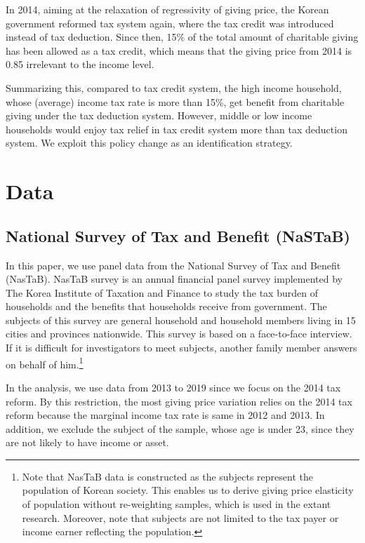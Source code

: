 \documentclass[
  11pt,
  a4paper,
]{article}
\begin{document}
  In 2014, aiming at the relaxation of regressivity of giving price, the Korean government reformed tax system again, where the tax credit was introduced instead of tax deduction. Since then, 15\% of the total amount of charitable giving has been allowed as a tax credit, which means that the giving price from 2014 is 0.85 irrelevant to the income level.

  Summarizing this, compared to tax credit system, the high income household, whose (average) income tax rate is more than 15\%, get benefit from charitable giving under the tax deduction system. However, middle or low income households would enjoy tax relief in tax credit system more than tax deduction system. We exploit this policy change as an identification strategy.

  \hypertarget{data}{%
  \section{Data}\label{data}}

  \hypertarget{national-survey-of-tax-and-benefit-nastab}{%
  \subsection{National Survey of Tax and Benefit (NaSTaB)}\label{national-survey-of-tax-and-benefit-nastab}}

  In this paper, we use panel data from the National Survey of Tax and Benefit (NasTaB).
  NasTaB survey is an annual financial panel survey
  implemented by The Korea Institute of Taxation and Finance
  to study the tax burden of households and the benefits that households receive from government.
  The subjects of this survey are general household and household members living in 15 cities
  and provinces nationwide.
  This survey is based on a face-to-face interview.
  If it is difficult for investigators to meet subjects, another family member answers on behalf of him.\footnote{Note that NasTaB data is constructed as the subjects represent the population of Korean society. This enables us to derive giving price elasticity of population without re-weighting samples, which is used in the extant research. Moreover, note that subjects are not limited to the tax payer or income earner reflecting the population.}

  In the analysis, we use data from 2013 to 2019 since
  we focus on the 2014 tax reform.
  By this restriction, the most giving price variation relies on the 2014 tax reform because
  the marginal income tax rate is same in 2012 and 2013.
  In addition, we exclude the subject of the sample, whose age is under 23, since they are not likely to have income or asset.
\end{document}

